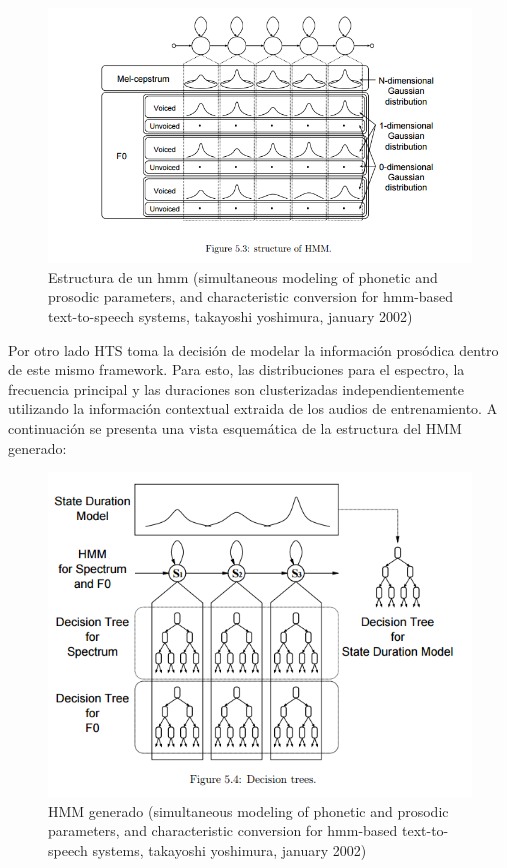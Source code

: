 \begin{figure}
\includegraphics[scale=0.5]{imagenes/hmm.png}
\caption{Estructura de un hmm (simultaneous modeling of phonetic and prosodic parameters, and characteristic conversion for hmm-based text-to-speech systems, takayoshi yoshimura, january 2002)}
\centering
\end{figure}

Por otro lado HTS toma la decisión de modelar la información prosódica dentro de este mismo framework. Para esto, las distribuciones para el espectro, la frecuencia principal y las duraciones son clusterizadas independientemente utilizando la información contextual extraida de los audios de entrenamiento. A continuación se presenta una vista esquemática de la estructura del HMM generado:

\begin{figure}
\includegraphics[scale=0.5]{imagenes/hmmContext.png}
\caption{HMM generado (simultaneous modeling of phonetic and prosodic parameters, and characteristic conversion for hmm-based text-to-speech systems, takayoshi yoshimura, january 2002)}
\centering
\end{figure}

